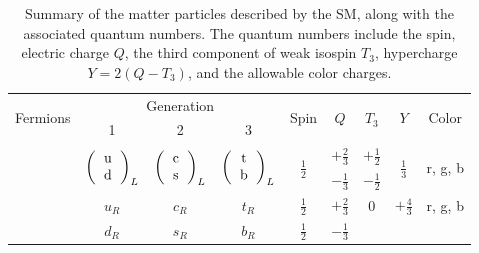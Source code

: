 \begin{table}
  \caption[
    Summary of the matter particles described by the SM, along with the
    associated quantum numbers.
  ]{
    Summary of the matter particles described by the SM, along with the
    associated quantum numbers.
    The quantum numbers include the spin, electric charge $Q$, the third
    component of weak isospin $T_3$, hypercharge $Y = 2 \left(Q-T_3\right)$,
    and the allowable color charges.
  }
  \label{tab:sm_matter_content}
  \begin{center}
    \begin{tabular}{ccccccccc}
      \toprule
      \multirow{2}{*}{Fermions} &
      \multicolumn{3}{c}{Generation} &
      \multirow{2}{*}{Spin} &
      \multirow{2}{*}{$Q$} &
      \multirow{2}{*}{$T_3$} &
      \multirow{2}{*}{$Y$} &
      \multirow{2}{*}{Color}
      \\[1ex]
      & 1 & 2 & 3
      \\
      \midrule
      \addlinespace[1ex]
      \multirow{5}{*}{Quarks} &
      \multirow{2}{*}{$\left(
        \begin{tabular}{c} u \\ d \end{tabular} \right)_{L}$ } & %
      \multirow{2}{*}{$\left(
        \begin{tabular}{c} c \\ s \end{tabular} \right)_{L}$ } & %
      \multirow{2}{*}{$\left(
        \begin{tabular}{c} t \\ b \end{tabular} \right)_{L}$ } & %
      \multirow{2}{*}{$\frac{1}{2}$} & %
      $+\frac{2}{3}$ & %
      $+\frac{1}{2}$ & %
      \multirow{2}{*}{$\frac{1}{3}$} & %
      \multirow{2}{*}{r, g, b} %
      \\[1ex]
      & %
      & %
      & %
      & %
      & %
      $-\frac{1}{3}$ & %
      $-\frac{1}{2}$ & %
      & %
      \\
      \cmidrule{2-9}
      &
      $u_R$ &
      $c_R$ &
      $t_R$ &
      $\frac{1}{2}$ & %
      $+\frac{2}{3}$ & %
      0 & %
      $+\frac{4}{3}$ & %
      r, g, b %
      \\[1ex]
      &
      $d_R$ &
      $s_R$ &
      $b_R$ &
      $\frac{1}{2}$ & %
      $-\frac{1}{3}$ & %

\end{tabular}
\end{center}
\end{table}
